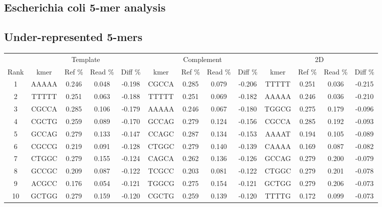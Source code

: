 \documentclass[a4paper,11pt,oneside]{article}
\begin{document}
\subsection*{Escherichia coli 5-mer analysis}
\subsection*{Under-represented 5-mers}
\vspace{-3mm}
\begin{table}[H]
{\footnotesize
\fontsize{7pt}{9pt}\selectfont
\begin{tabular}{|c|c c c c|c c c c|c c c c|}
\cline{1-13}
 & \multicolumn{4}{c|}{Template} & \multicolumn{4}{c|}{Complement} & \multicolumn{4}{c|}{2D} \\
Rank & kmer & Ref \% & Read \% & Diff \% & kmer & Ref \% & Read \% & Diff \% & kmer & Ref \% & Read \% & Diff \% \\
\cline{1-13}
1 & AAAAA & 0.246 & 0.048 & -0.198 & CGCCA & 0.285 & 0.079 & -0.206 & TTTTT & 0.251 & 0.036 & -0.215 \\
2 & TTTTT & 0.251 & 0.063 & -0.188 & TTTTT & 0.251 & 0.069 & -0.182 & AAAAA & 0.246 & 0.036 & -0.210 \\
3 & CGCCA & 0.285 & 0.106 & -0.179 & AAAAA & 0.246 & 0.067 & -0.180 & TGGCG & 0.275 & 0.179 & -0.096 \\
4 & CGCTG & 0.259 & 0.089 & -0.170 & GCCAG & 0.279 & 0.124 & -0.156 & CGCCA & 0.285 & 0.192 & -0.093 \\
5 & GCCAG & 0.279 & 0.133 & -0.147 & CCAGC & 0.287 & 0.134 & -0.153 & AAAAT & 0.194 & 0.105 & -0.089 \\
6 & CGCCG & 0.219 & 0.091 & -0.128 & CTGGC & 0.279 & 0.140 & -0.139 & CAAAA & 0.169 & 0.087 & -0.082 \\
7 & CTGGC & 0.279 & 0.155 & -0.124 & CAGCA & 0.262 & 0.136 & -0.126 & GCCAG & 0.279 & 0.200 & -0.079 \\
8 & GCCGC & 0.209 & 0.087 & -0.122 & TCGCC & 0.203 & 0.081 & -0.122 & CTGGC & 0.279 & 0.201 & -0.078 \\
9 & ACGCC & 0.176 & 0.054 & -0.121 & TGGCG & 0.275 & 0.154 & -0.121 & GCTGG & 0.279 & 0.206 & -0.073 \\
10 & GCTGG & 0.279 & 0.159 & -0.120 & CGCTG & 0.259 & 0.139 & -0.120 & TTTTG & 0.172 & 0.099 & -0.073 \\
\cline{1-13}
\end{tabular}
}
\end{table}
\vspace{-3mm}
\end{document}
